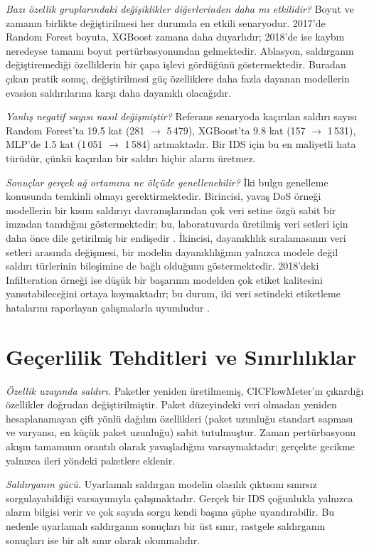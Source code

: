 \documentclass[conference]{IEEEtran}
\begin{document}
\emph{Bazı özellik gruplarındaki değişiklikler diğerlerinden daha mı etkilidir?} Boyut ve zamanın birlikte değiştirilmesi her durumda en etkili senaryodur. 2017'de Random Forest boyuta, XGBoost zamana daha duyarlıdır; 2018'de ise kaybın neredeyse tamamı boyut pertürbasyonundan gelmektedir. Ablasyon, saldırganın değiştiremediği özelliklerin bir çapa işlevi gördüğünü göstermektedir. Buradan çıkan pratik sonuç, değiştirilmesi güç özelliklere daha fazla dayanan modellerin evasion saldırılarına karşı daha dayanıklı olacağıdır.

\emph{Yanlış negatif sayısı nasıl değişmiştir?} Referans senaryoda kaçırılan saldırı sayısı Random Forest'ta 19.5 kat (281 $\rightarrow$ 5\,479), XGBoost'ta 9.8 kat (157 $\rightarrow$ 1\,531), MLP'de 1.5 kat (1\,051 $\rightarrow$ 1\,584) artmaktadır. Bir IDS için bu en maliyetli hata türüdür, çünkü kaçırılan bir saldırı hiçbir alarm üretmez.

\emph{Sonuçlar gerçek ağ ortamına ne ölçüde genellenebilir?} İki bulgu genelleme konusunda temkinli olmayı gerektirmektedir. Birincisi, yavaş DoS örneği modellerin bir kısım saldırıyı davranışlarından çok veri setine özgü sabit bir imzadan tanıdığını göstermektedir; bu, laboratuvarda üretilmiş veri setleri için daha önce dile getirilmiş bir endişedir \cite{sommer2010,arp2022}. İkincisi, dayanıklılık sıralamasının veri setleri arasında değişmesi, bir modelin dayanıklılığının yalnızca modele değil saldırı türlerinin bileşimine de bağlı olduğunu göstermektedir. 2018'deki Infilteration örneği ise düşük bir başarının modelden çok etiket kalitesini yansıtabileceğini ortaya koymaktadır; bu durum, iki veri setindeki etiketleme hatalarını raporlayan çalışmalarla uyumludur \cite{engelen2021,liu2022}.

\section{Geçerlilik Tehditleri ve Sınırlılıklar}

\emph{Özellik uzayında saldırı.} Paketler yeniden üretilmemiş, CICFlowMeter'ın çıkardığı özellikler doğrudan değiştirilmiştir. Paket düzeyindeki veri olmadan yeniden hesaplanamayan çift yönlü dağılım özellikleri (paket uzunluğu standart sapması ve varyansı, en küçük paket uzunluğu) sabit tutulmuştur. Zaman pertürbasyonu akışın tamamının orantılı olarak yavaşladığını varsaymaktadır; gerçekte gecikme yalnızca ileri yöndeki paketlere eklenir.

\emph{Saldırganın gücü.} Uyarlamalı saldırgan modelin olasılık çıktısını sınırsız sorgulayabildiği varsayımıyla çalışmaktadır. Gerçek bir IDS çoğunlukla yalnızca alarm bilgisi verir ve çok sayıda sorgu kendi başına şüphe uyandırabilir. Bu nedenle uyarlamalı saldırganın sonuçları bir üst sınır, rastgele saldırganın sonuçları ise bir alt sınır olarak okunmalıdır.
\end{document}
